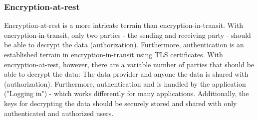 \documentclass[journal, dvipsnames]{IEEEtran}
\begin{document}
\begin{table}[!t]
  \renewcommand{\arraystretch}{1.3}
  \caption{Comparison of End-to-end encryption options}
  \centering
  \label{tab_optionsComparison}
\end{table}

\subsubsection{\texorpdfstring{}{} Encryption-at-rest}
Encryption-at-rest is a more intricate terrain than encryption-in-transit. With encryption-in-transit, only two parties - the sending and receiving party - should be able to decrypt the data (authorization). Furthermore, authentication is an established terrain in encryption-in-transit using TLS certificates. With encryption-at-rest, however, there are a variable number of parties that should be able to decrypt the data: The data provider and anyone the data is shared with (authorization). Furthermore, authentication and is handled by the application ("Logging in") - which works differently for many applications. Additionally, the keys for decrypting the data should be securely stored and shared with only authenticated and authorized users. 
\end{document}
